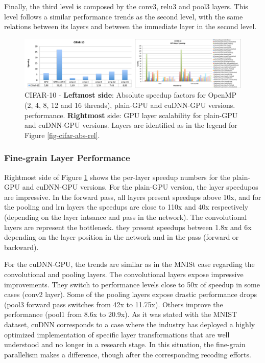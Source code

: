Finally, the third level is composed by the conv3, relu3 and pool3 
layers. This level follows a similar performance trends as the second 
level, with the same relations between its layers and between the 
immediate layer in the second level.

\begin{figure}[]
\includegraphics[width=\textwidth]{figures/cifar-abs-perf+gpu-layer.pdf}
\caption{CIFAR-10 - \textbf{Leftmost side}: Absolute speedup factors for OpenMP (2, 4, 8, 12 and 16 threads), plain-GPU and cuDNN-GPU versions. performance. \textbf{Rightmost} side: GPU layer scalability for plain-GPU and cuDNN-GPU versions. Layers are identified as in the legend for Figure \ref{fig-cifar-abs-rel}.}
\label{fig-cifar-overall}
\end{figure}

\subsubsection{Fine-grain Layer Performance}
Rightmost side of Figure \ref{fig-cifar-overall} shows the per-layer
speedup numbers for the plain-GPU and cuDNN-GPU versions.
For the plain-GPU version, the layer speedupos are impressive. 
In the forward pass, all layers present speedups above 10x, and for 
the pooling and lrn layers the speedups are close to 110x and 40x 
respectively (depending on the layer intsance and pass in the network). 
The convolutional layers are represent the bottleneck. they present 
speedups between 1.8x and 6x depending on the layer position in the 
network and in the pass (forward or backward).

For the cuDNN-GPU, the trends are similar as in the MNISt case 
regarding the convolutional and pooling layers. The convolutional 
layers expose impressive improvements. They switch to performance 
levels close to 50x of speedup in some cases (conv2 layer).
Some of the pooling layers expose drastic performance drops (pool3 
forward pass switches from 42x to 11.75x). Others improve the 
performance (pool1 from 8.6x to 20.9x). 
As it was stated with the MNIST dataset, cuDNN corresponds to a case 
where the industry has deployed a highly optimized implementation of 
specific layer transformations that are well understood and no longer 
in a research stage. In this situation, the fine-grain parallelism makes 
a difference, though after the corresponding recoding efforts.

